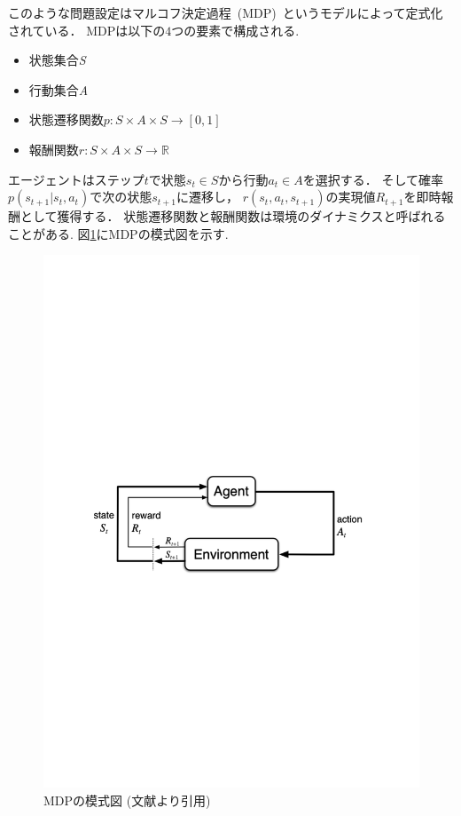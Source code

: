 このような問題設定はマルコフ決定過程~(MDP)~というモデルによって定式化されている．
MDPは以下の$4$つの要素で構成される. 
\begin{itemize}
  \item 状態集合\textit{S}
  \item 行動集合\textit{A}
  \item 状態遷移関数$p:S \times A \times S \rightarrow [0,1]$
  \item 報酬関数$r:S \times A \times S \rightarrow \mathbb{R}$
\end{itemize}
エージェントはステップ$t$で状態$s_t \in S$から行動$a_t \in A$を選択する．
そして確率$p(s_{t+1}|s_t,a_t)$で次の状態$s_{t+1}$に遷移し， $r(s_t,a_t,s_{t+1})$の実現値$R_{t+1}$を即時報酬として獲得する．
状態遷移関数と報酬関数は環境のダイナミクスと呼ばれることがある. 
図\ref{fig:mdp}にMDPの模式図を示す.
\begin{figure}[h]
  \centering
  \includegraphics[width=\linewidth{}]{figures/MDP.pdf}
  \caption{MDPの模式図 (文献\cite{Sutton1998}より引用) \label{fig:mdp}}
\end{figure}

